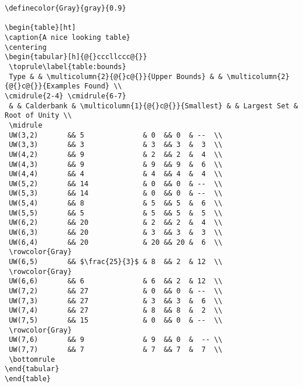 \begin{singlespace}
\begin{lstlisting}
\definecolor{Gray}{gray}{0.9}

\begin{table}[ht]
\caption{A nice looking table}
\centering
\begin{tabular}[h]{@{}cccllccc@{}}
 \toprule\label{table:bounds}
 Type & & \multicolumn{2}{@{}c@{}}{Upper Bounds} & & \multicolumn{2}{@{}c@{}}{Examples Found} \\
\cmidrule{2-4} \cmidrule{6-7}
 & & Calderbank & \multicolumn{1}{@{}c@{}}{Smallest} & & Largest Set & Root of Unity \\
 \midrule
 UW(3,2)       && 5              & 0  && 0  & --  \\
 UW(3,3)       && 3              & 3  && 3  &  3  \\
 UW(4,2)       && 9              & 2  && 2  &  4  \\
 UW(4,3)       && 9              & 9  && 9  &  6  \\
 UW(4,4)       && 4              & 4  && 4  &  4  \\
 UW(5,2)       && 14             & 0  && 0  & --  \\
 UW(5,3)       && 14             & 0  && 0  & --  \\
 UW(5,4)       && 8              & 5  && 5  &  6  \\
 UW(5,5)       && 5              & 5  && 5  &  5  \\
 UW(6,2)       && 20             & 2  && 2  &  4  \\
 UW(6,3)       && 20             & 3  && 3  &  3  \\
 UW(6,4)       && 20             & 20 && 20 &  6  \\
 \rowcolor{Gray}
 UW(6,5)       && $\frac{25}{3}$ & 8  && 2  & 12  \\
 \rowcolor{Gray}
 UW(6,6)       && 6              & 6  && 2  & 12  \\
 UW(7,2)       && 27             & 0  && 0  & --  \\
 UW(7,3)       && 27             & 3  && 3  &  6  \\
 UW(7,4)       && 27             & 8  && 8  &  2  \\
 UW(7,5)       && 15             & 0  && 0  & --  \\
 \rowcolor{Gray}
 UW(7,6)       && 9              & 9  && 0  &  -- \\
 UW(7,7)       && 7              & 7  && 7  &  7  \\
 \bottomrule
\end{tabular}
\end{table}
\end{lstlisting}
\end{singlespace}

